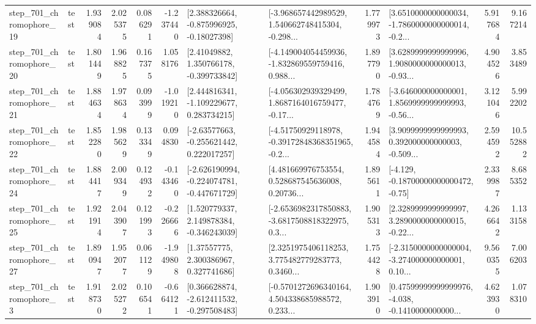 \begin{tabular}{llrrrrllrlrr}
  step\_701\_chromophore\_19 &      test &      1.939084 &    2.025375 &      0.086291 & -1.237440 &    [2.388326664, -0.875996925, -0.18027398] &  [-3.968657442989529, 1.540662748415304, -0.298... &       1.779973 &  [3.6510000000000034, -1.7860000000000014, -0.2... &            5.917684 &          9.167214 \\
  step\_701\_chromophore\_20 &      test &      1.801449 &    1.968825 &      0.167375 &  1.058176 &     [2.41049882, 1.350766178, -0.399733842] &  [-4.149004054459936, -1.832869559759416, 0.988... &       1.897790 &  [3.6289999999999996, 1.9080000000000013, -0.93... &            4.904526 &          3.853489 \\
  step\_701\_chromophore\_21 &      test &      1.884634 &    1.978634 &      0.093999 & -1.019210 &    [2.444816341, -1.109229677, 0.283734215] &  [-4.056302939329499, 1.8687164016759477, -0.17... &       1.784769 &  [-3.646000000000001, 1.8569999999999993, -0.56... &            3.121046 &          5.992202 \\
  step\_701\_chromophore\_22 &      test &      1.852280 &    1.985629 &      0.133349 &  0.094830 &    [-2.63577663, -0.255621442, 0.222017257] &  [-4.51750929118978, -0.39172848368351965, -0.2... &       1.944584 &  [3.9099999999999993, 0.392000000000003, -0.509... &            2.594592 &         10.552882 \\
  step\_701\_chromophore\_24 &      test &      1.884417 &    2.009349 &      0.124932 & -0.143460 &  [-2.626190994, -0.224074781, -0.447671729] &  [4.481669976753554, 0.528687545636008, 0.20736... &       1.895611 &              [-4.129, -0.18700000000000472, -0.75] &            2.339987 &          8.685352 \\
  step\_701\_chromophore\_25 &      test &      1.921914 &    2.043907 &      0.121993 & -0.226666 &    [1.520779337, 2.149878384, -0.346243039] &  [-2.6536982317850883, -3.6817508818322975, 0.3... &       1.905313 &  [2.3289999999999997, 3.2890000000000015, -0.22... &            4.266642 &          1.133158 \\
  step\_701\_chromophore\_27 &      test &      1.890947 &    1.952077 &      0.061129 & -1.949808 &      [1.37557775, 2.300386967, 0.327741686] &  [2.3251975406118253, 3.775482779283773, 0.3460... &       1.754428 &  [-2.3150000000000004, -3.274000000000001, 0.10... &            9.560355 &          7.006203 \\
   step\_701\_chromophore\_3 &      test &      1.918730 &    2.025272 &      0.106541 & -0.664121 &   [0.366628874, -2.612411532, -0.297508483] &  [-0.5701272696340164, 4.504338685988572, 0.233... &       1.903910 &  [0.47599999999999976, -4.038, -0.1410000000000... &            4.623930 &          1.078310 \\

\end{tabular}

